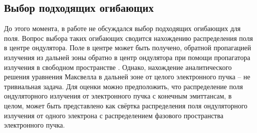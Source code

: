 \subsection{Выбор подходящих огибающих}
До этого момента, в работе не обсуждался выбор подходящих огибающих для поля. Вопрос выбора таких огибающих сводится нахождению распределения поля в центре ондулятора. Поле в центре может быть получено, обратной пропагацией излучения из дальней зоны обратно в центр ондулятора при помощи пропагатора излучения в свободном пространстве . Однако, нахождение аналитического решения уравнения Максвелла в дальней зоне от целого электронного пучка -- не тривиальная задача.  Для оценки можно предположить, что распределение поля ондуляторного излучения от электронного пучка с конечным эмиттансам, в целом, может быть представлено как свёртка распределения поля ондуляторного излучения от одного электрона с распределением фазового пространства электронного пучка.

